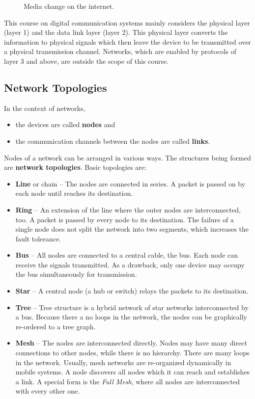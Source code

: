 \begin{refsection}
\begin{figure}[H]
	\centering
	\caption{Media change on the internet. }
	\label{fig:ch01:media_changes}
\end{figure}

This course on digital communication systems mainly considers the physical layer (layer 1) and the data link layer (layer 2). This physical layer converts the information to physical signals which then leave the device to be transmitted over a physical transmission channel. Networks, which are enabled by protocols of layer 3 and above, are outside the scope of this course.


\subsection{Network Topologies}

In the context of networks,
\begin{itemize}
	\item the devices are called  \textbf{nodes} and
	\item the communication channels between the nodes are called  \textbf{links}.
\end{itemize}

Nodes of a network can be arranged in various ways. The structures being formed are  \textbf{network topologies}. Basic topologies are:
\begin{itemize}
	\item \textbf{Line} or chain -- The nodes are connected in series. A packet is passed on by each node until reaches its destination.
	\item \textbf{Ring} -- An extension of the line where the outer nodes are interconnected, too. A packet is passed by every node to its destination. The failure of a single node does not split the network into two segments, which increases the fault tolerance.
	\item \textbf{Bus} -- All nodes are connected to a central cable, the bus. Each node can receive the signals transmitted. As a drawback, only one device may occupy the bus simultaneously for transmission.
	\item \textbf{Star} -- A central node (a hub or switch) relays the packets to its destination.
	\item \textbf{Tree} -- Tree structure is a hybrid network of star networks interconnected by a bus. Because there a no loops in the network, the nodes can be graphically re-ordered to a tree graph.
	\item \textbf{Mesh} -- The nodes are interconnected directly. Nodes may have many direct connections to other nodes, while there is no hierarchy. There are many loops in the network. Usually, mesh networks are re-organized dynamically in mobile systems. A node discovers all nodes which it can reach and establishes a link. A special form is the \emph{Full Mesh}, where all nodes are interconnected with every other one.
\end{itemize}


\end{refsection}
